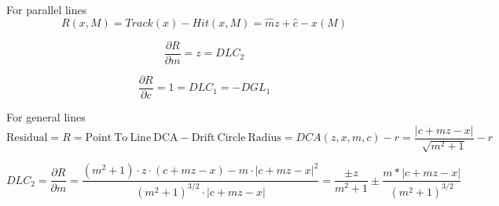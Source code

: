 \documentclass[a4paper,11pt]{article}
\begin{document}
\clearpage
For parallel lines
\begin{equation}
R(x,M) = Track(x) - Hit(x,M) = \hat{m}z+\hat{c} - x(M)	
\end{equation}

\begin{equation}
\frac{ \partial R}{\partial m} = z	= DLC_2
\end{equation}

\begin{equation}
\frac{ \partial R}{\partial c} = 1	=DLC_1 = - DGL_1
\end{equation}

For general lines
\begin{equation}	
\mathrm{Residual}= R =\mathrm{Point \ To \ Line \ DCA} - \mathrm{Drift \ Circle \ Radius} = DCA(z,x,m,c) - r = \frac{ |c+mz-x| }  { \sqrt{m^2+1} } -r
\end{equation}


\begin{equation}
DLC_2 = \frac{ \partial R}{\partial m} = \frac{ (m^2+1)\cdot z\cdot(c+mz-x) - m\cdot |c+mz-x|^2 }{ (m^2+1)^{3/2} \cdot |c+mz-x|  } = \frac{\pm z}{m^2+1} \pm \frac{m*|c+mz-x|}{(m^2+1)^{3/2}}
\end{equation}

\nocite{*}
\thispagestyle{plain}
%
\end{document}
